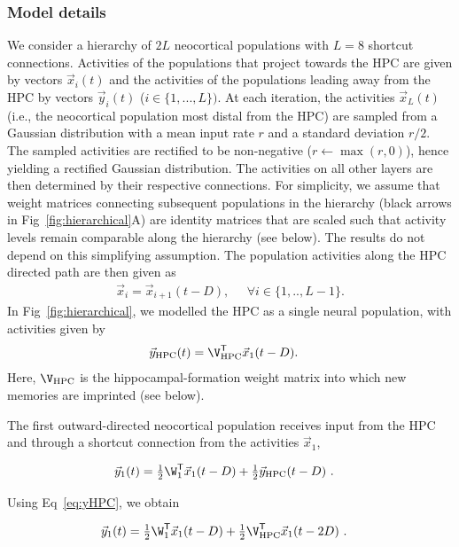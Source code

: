 \subsubsection{Model details}
We consider a hierarchy of $2 L$ neocortical populations with $L=8$ shortcut connections. Activities of the populations that project towards the HPC are given by vectors $\vec{x}_i(t)$ and the activities of the populations leading away from the HPC by vectors $\vec{y}_i(t)$ ($i\in \{1,...,L\})$. At each iteration, the activities $\vec{x}_L(t)$ (i.e., the neocortical population most distal from the HPC) are sampled from a Gaussian distribution with a mean input rate $r$  and a standard deviation $r/2$. The sampled activities are rectified to be non-negative ($r\leftarrow \max(r,0)$), hence yielding a rectified Gaussian distribution.
The activities on all other layers are then determined by their respective connections. For simplicity, we assume that weight matrices connecting subsequent populations in the hierarchy (black arrows in Fig~\ref{fig:hierarchical}A) are identity matrices that are scaled such that activity levels remain comparable along the hierarchy (see below). The results do not depend on this simplifying assumption. The population activities along the HPC directed path are then given as
\begin{align}
\vec{x}_i = \vec{x}_{i+1}(t-D), \;\;\;\;\; \forall i \in \{1,..,L-1\}.
\end{align}
In Fig~\ref{fig:hierarchical}, we modelled the HPC as a single neural population, with activities given by
\begin{align}
\vec{y}_{\rm HPC}(t) &= \V_{\rm HPC}^\mathsf{T} \vec{x}_{1}(t-D).
\label{eq:yHPC}
\end{align}
Here, $\V_{\rm HPC}$ is the hippocampal-formation weight matrix into which new memories are imprinted (see below).

The first outward-directed neocortical population receives input from the HPC and through a shortcut connection from the activities $\vec{x}_1$,

\begin{align}
\vec{y}_{1}(t) &= \tfrac{1}{2} \W_{1}^\mathsf{T} \vec{x}_{1}(t-D) + \tfrac{1}{2} \vec{y}_{\rm HPC}(t-D)\ .
\end{align}

 
\noindent
Using Eq~\eqref{eq:yHPC}, we obtain

\begin{align}
\vec{y}_{1}(t) &=
\tfrac{1}{2} \W_{1}^\mathsf{T} \vec{x}_{1}(t-D) + \tfrac{1}{2}
\V_{\rm HPC}^\mathsf{T} \vec{x}_{1}(t-2D)\ .
\label{eq:yHPC2}
\end{align}


